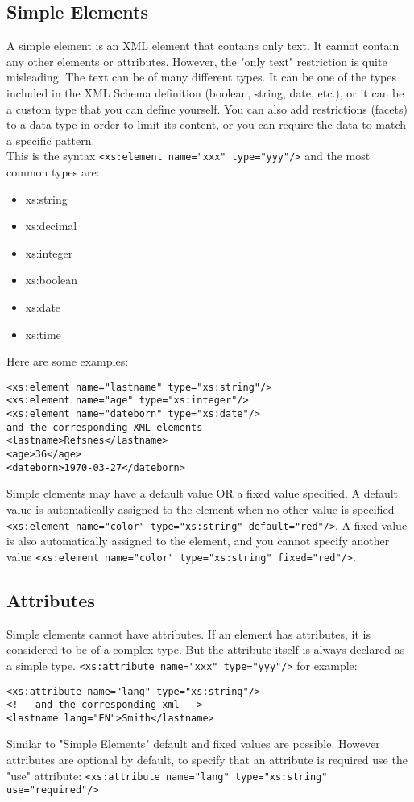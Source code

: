 \documentclass[11pt]{article}
\begin{document}
\subsection{Simple Elements}
\label{sec:orgfa38daf}
A simple element is an XML element that contains only text. It cannot contain any other elements or attributes. However, the "only text" restriction is quite misleading. The text can be of many different types. It can be one of the types included in the XML Schema definition (boolean, string, date, etc.), or it can be a custom type that you can define yourself.
You can also add restrictions (facets) to a data type in order to limit its content, or you can require the data to match a specific pattern.\\
This is the syntax \texttt{<xs:element name="xxx" type="yyy"/>} and the most common types are:
\begin{itemize}
\item xs:string
\item xs:decimal
\item xs:integer
\item xs:boolean
\item xs:date
\item xs:time
\end{itemize}
Here are some examples:
\lstset{breaklines=true,language=XML,label= ,caption= ,captionpos=b,numbers=none}
\begin{lstlisting}
<xs:element name="lastname" type="xs:string"/>
<xs:element name="age" type="xs:integer"/>
<xs:element name="dateborn" type="xs:date"/>
and the corresponding XML elements
<lastname>Refsnes</lastname>
<age>36</age>
<dateborn>1970-03-27</dateborn>
\end{lstlisting}
Simple elements may have a default value OR a fixed value specified.
A default value is automatically assigned to the element when no other value is specified \texttt{<xs:element name="color" type="xs:string" default="red"/>}. A fixed value is also automatically assigned to the element, and you cannot specify another value \texttt{<xs:element name="color" type="xs:string" fixed="red"/>}.

\subsection{Attributes}
\label{sec:org0095bbf}
Simple elements cannot have attributes. If an element has attributes, it is considered to be of a complex type. But the attribute itself is always declared as a simple type. \texttt{<xs:attribute name="xxx" type="yyy"/>} for example:
\lstset{breaklines=true,language=XML,label= ,caption= ,captionpos=b,numbers=none}
\begin{lstlisting}
<xs:attribute name="lang" type="xs:string"/>
<!-- and the corresponding xml -->
<lastname lang="EN">Smith</lastname>
\end{lstlisting}
Similar to "Simple Elements" default and fixed values are possible. However attributes are optional by default, to specify that an attribute is required use the "use" attribute: \texttt{<xs:attribute name="lang" type="xs:string" use="required"/>}
\end{document}
